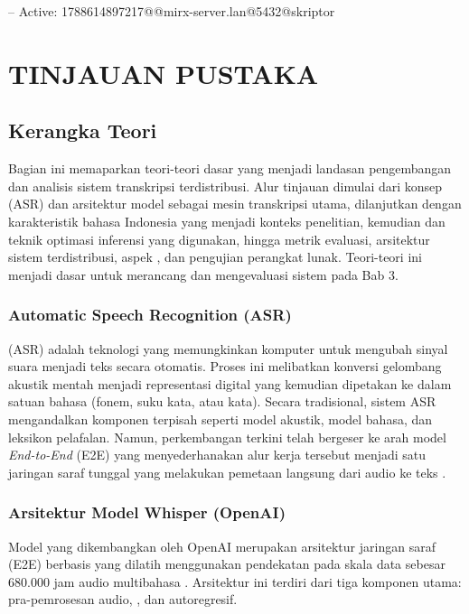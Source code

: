-- Active: 1788614897217@@mirx-server.lan@5432@skriptor
\chapter{TINJAUAN PUSTAKA}

\section{Kerangka Teori}
Bagian ini memaparkan teori-teori dasar yang menjadi landasan pengembangan dan analisis sistem transkripsi terdistribusi. Alur tinjauan dimulai dari konsep  (ASR) dan arsitektur model  sebagai mesin transkripsi utama, dilanjutkan dengan karakteristik bahasa Indonesia yang menjadi konteks penelitian, kemudian   dan teknik optimasi inferensi yang digunakan, hingga metrik evaluasi, arsitektur sistem terdistribusi, aspek , dan pengujian perangkat lunak. Teori-teori ini menjadi dasar untuk merancang dan mengevaluasi sistem pada Bab 3.

\subsection{Automatic Speech Recognition (ASR)}
 (ASR) adalah teknologi yang memungkinkan komputer untuk mengubah sinyal suara menjadi teks secara otomatis. Proses ini melibatkan konversi gelombang akustik mentah menjadi representasi digital yang kemudian dipetakan ke dalam satuan bahasa (fonem, suku kata, atau kata). Secara tradisional, sistem ASR mengandalkan komponen terpisah seperti model akustik, model bahasa, dan leksikon pelafalan. Namun, perkembangan terkini telah bergeser ke arah model \textit{End-to-End} (E2E) yang menyederhanakan alur kerja tersebut menjadi satu jaringan saraf tunggal yang melakukan pemetaan langsung dari audio ke teks .

\subsection{Arsitektur Model Whisper (OpenAI)}
Model  yang dikembangkan oleh OpenAI merupakan arsitektur jaringan saraf  (E2E) berbasis  yang dilatih menggunakan pendekatan  pada skala data sebesar 680.000 jam audio multibahasa . Arsitektur ini terdiri dari tiga komponen utama: pra-pemrosesan audio, , dan  autoregresif.

